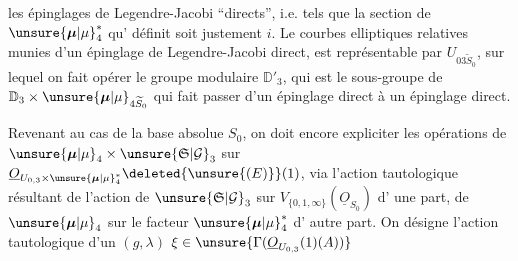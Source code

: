 les  épinglages de Legendre-Jacobi
``directs'', i.e. tels que la section de $\unsure{\boldsymbol{\mu}|\mu}_4^*$ qu'
 définit soit justement $i$. 
Le  courbes elliptiques relatives
 munies
d'un épinglage de Legendre-Jacobi direct,
est représentable par $U_{03\widetilde S_0}$, sur
lequel on fait opérer le groupe modulaire
$\mathbb{D}'_3$, qui est  le sous-groupe
de $\mathbb{D}_3\times\unsure{\boldsymbol{\mu}|\mu}_{4\widetilde S_0}$ qui fait passer d'un
épinglage direct à un épinglage direct.

Revenant au cas de la base absolue
$S_0$, on doit encore expliciter les
opérations de $\unsure{\boldsymbol{\mu}|\mu}_4\times\unsure{\mathfrak{S}|\mathcal G}_3$ sur
$\underline{O}_{U_{0,3}\times\unsure{\boldsymbol{\mu}|\mu}_4^*}\deleted{\unsure{(E)}}(1)$,
via l'action tautologique résultant de
l'action de $\unsure{\mathfrak{S}|\mathcal G}_3$ sur
$V_{\{0,1,\infty\}}(\underline{O}_{S_0})$ d'
une part, de  $\unsure{\boldsymbol{\mu}|\mu}_4$ sur le facteur $\unsure{\boldsymbol{\mu}|\mu}_4^*$ d'
autre part. On désigne l'action tautologique
d'un $(g,\lambda)$ 
$\xi\in\unsure{\Gamma(\underline{O}_{U_{0,3}}(1)(A))}$
